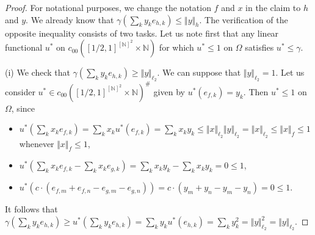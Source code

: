 \documentclass[a4paper]{amsart}
\theoremstyle{plain}
\theoremstyle{remark}
\begin{document}
\begin{proof}
For notational purposes, we change the notation $ f $ and $ x $ in the claim to $ h $ and $ y $. We already know that $ \gamma(\sum_{k} y_{k} e_{h, k}) \leq \Vert y \Vert_{h} $. The verification of the opposite inequality consists of two tasks. Let us note first that any linear functional $ u^{*} $ on $ c_{00}([1/2, 1]^{[\mathbb{N}]^{2}} \times \mathbb{N}) $ for which $ u^{*} \leq 1 $ on $ \Omega $ satisfies $ u^{*} \leq \gamma $.
	
(i) We check that $ \gamma(\sum_{k} y_{k} e_{h, k}) \geq \Vert y \Vert_{\ell_{2}} $. We can suppose that $ \Vert y \Vert_{\ell_{2}} = 1 $. Let us consider $ u^{*} \in c_{00}([1/2, 1]^{[\mathbb{N}]^{2}} \times \mathbb{N})^{\#} $ given by $ u^{*}(e_{f, k}) = y_{k} $. Then $ u^{*} \leq 1 $ on $ \Omega $, since
\begin{itemize}
\item $ u^{*}(\sum_{k} x_{k} e_{f, k}) = \sum_{k} x_{k} u^{*}(e_{f, k}) = \sum_{k} x_{k} y_{k} \leq \Vert x \Vert_{\ell_{2}} \Vert y \Vert_{\ell_{2}} = \Vert x \Vert_{\ell_{2}} \leq \Vert x \Vert_{f} \leq 1 $ whenever $ \Vert x \Vert_{f} \leq 1 $,
\item $ u^{*}(\sum_{k} x_{k} e_{f, k} - \sum_{k} x_{k} e_{g, k}) = \sum_{k} x_{k} y_{k} - \sum_{k} x_{k} y_{k} = 0 \leq 1 $,
\item $ u^{*}(c \cdot (e_{f, m} + e_{f, n} - e_{g, m} - e_{g, n})) = c \cdot (y_{m} + y_{n} - y_{m} - y_{n}) = 0 \leq 1 $.
\end{itemize}
It follows that $ \gamma(\sum_{k} y_{k} e_{h, k}) \geq u^{*}(\sum_{k} y_{k} e_{h, k}) = \sum_{k} y_{k} u^{*}(e_{h, k}) = \sum_{k} y_{k}^{2} = \Vert y \Vert_{\ell_{2}}^{2} = \Vert y \Vert_{\ell_{2}} $.
	

\end{proof}
\end{document}
